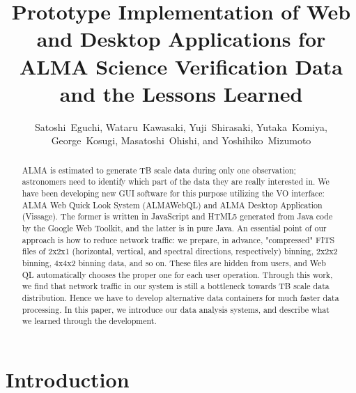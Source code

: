 
\resetcounters




\title{Prototype Implementation of Web and Desktop Applications for ALMA Science Verification Data and the Lessons Learned}
\author{Satoshi~Eguchi, Wataru~Kawasaki, Yuji~Shirasaki, Yutaka~Komiya, George~Kosugi, Masatoshi~Ohishi, and Yoshihiko~Mizumoto
}


\begin{abstract}
ALMA is estimated to generate TB scale data during only one observation; astronomers need to identify which part of the data they are really interested in. We have been developing new GUI software for this purpose utilizing the VO interface: ALMA Web Quick Look System (ALMAWebQL) and ALMA Desktop Application (Vissage). The former is written in JavaScript and HTML5 generated from Java code by the Google Web Toolkit, and the latter is in pure Java. An essential point of our approach is how to reduce network traffic: we prepare, in advance, "compressed" FITS files of 2x2x1 (horizontal, vertical, and spectral directions, respectively) binning, 2x2x2 binning, 4x4x2 binning data, and so on. These files are hidden from users, and Web QL automatically chooses the proper one for each user operation. Through this work, we find that network traffic in our system is still a bottleneck towards TB scale data distribution. Hence we have to develop alternative data containers for much faster data processing. In this paper, we introduce our data analysis systems, and describe what we learned through the development.
\end{abstract}

\section{Introduction}

